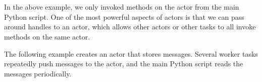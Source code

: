\section{}

In the above example, we only invoked methods on the actor from the main Python script. One of the most powerful aspects of actors is that we can pass around handles to an actor, which allows other actors or other tasks to all invoke methods on the same actor.

The following example creates an actor that stores messages. Several worker tasks repeatedly push messages to the actor, and the main Python script reads the messages periodically.
